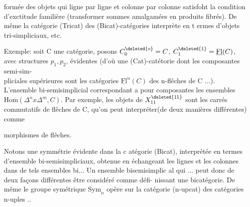 formée des objets qui ligne par ligne et colonne par colonne satisfoht la
condition d'exctitude familière (transformer sommes amalgamées en produits
fibrés). De même la catégorie  (Tricat) des (Bicat)-catégories
interprète en t ermes d'objets tri-simpliciaux, etc.

Exemple: soit C une catégorie, posons $C^{\deleted{o}}_{0}=C$, $C^{\deleted{1}}_{1}=\underline{\mathrm{Fl}}(C)$, avec structures
$p_1,p_2$, évidentes (d'où une (Cat)-catétorie dont les composantes semi-sim-\\
pliciales supérieures sont les catégories $\underline{\mathrm{Fl}}^n(C)$ des n-flêches de C ...).
L'ensemble bi-semisimplicial correspondant a pour composantes les ensembles
$\mathrm{Hom}(\Delta^n x\Delta^m,C)$. Par exemple, les objets de $X^{\deleted{11}}_{11}$ sont les carrés commutatifs
de flêches de C, qu'on peut interpréter(de deux manières différentes) comme



morphismes de flêches.

Notons une symmétrie évidente dans la c atégorie (Bicat), interprétée
en termes d'ensemble bi-semisimpliciaux, obtenue en échangeant les lignes
et les colonnes dans  de tels ensembles bi... Un ensemble bisemisimplic\linebreak
al qui ... peut donc de deux façons différentes être considéré comme défi-\linebreak
nissant une bicatégorie. De même le groupe symétrique $\mathrm{Sym}_n$ opère sur
la catégorie  (n-upcat) des catégories n-uples ..


